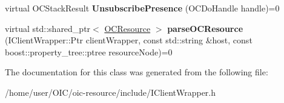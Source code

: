 \begin{DoxyCompactItemize}
\item 
\hypertarget{classOC_1_1IClientWrapper_a6fc9f90a5a0b73acddd8088aa0c35fe1}{}virtual O\+C\+Stack\+Result {\bfseries Unsubscribe\+Presence} (O\+C\+Do\+Handle handle)=0\label{classOC_1_1IClientWrapper_a6fc9f90a5a0b73acddd8088aa0c35fe1}

\item 
\hypertarget{classOC_1_1IClientWrapper_a2d644e6bf3b8e54950892947c9db6166}{}virtual std\+::shared\+\_\+ptr$<$ \hyperlink{classOC_1_1OCResource}{O\+C\+Resource} $>$ {\bfseries parse\+O\+C\+Resource} (I\+Client\+Wrapper\+::\+Ptr client\+Wrapper, const std\+::string \&host, const boost\+::property\+\_\+tree\+::ptree resource\+Node)=0\label{classOC_1_1IClientWrapper_a2d644e6bf3b8e54950892947c9db6166}

\end{DoxyCompactItemize}


The documentation for this class was generated from the following file\+:\begin{DoxyCompactItemize}
\item 
/home/user/\+O\+I\+C/oic-\/resource/include/I\+Client\+Wrapper.\+h\end{DoxyCompactItemize}
